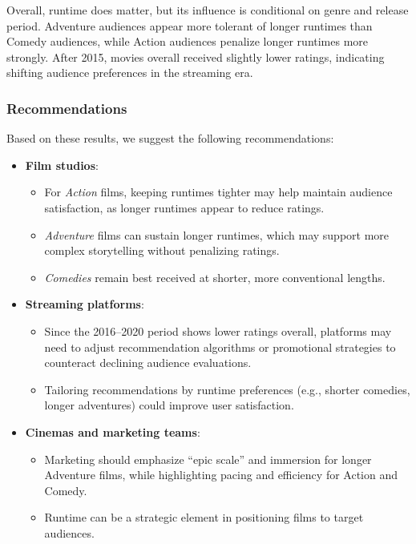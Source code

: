 \documentclass[
]{article}
\providecommand{\tightlist}{%
  \setlength{\itemsep}{0pt}\setlength{\parskip}{0pt}}
\begin{document}
Overall, runtime does matter, but its influence is conditional on genre
and release period. Adventure audiences appear more tolerant of longer
runtimes than Comedy audiences, while Action audiences penalize longer
runtimes more strongly. After 2015, movies overall received slightly
lower ratings, indicating shifting audience preferences in the streaming
era.

\subsubsection{Recommendations}\label{recommendations}

Based on these results, we suggest the following recommendations:

\begin{itemize}
\tightlist
\item
  \textbf{Film studios}:

  \begin{itemize}
  \tightlist
  \item
    For \emph{Action} films, keeping runtimes tighter may help maintain
    audience satisfaction, as longer runtimes appear to reduce
    ratings.\\
  \item
    \emph{Adventure} films can sustain longer runtimes, which may
    support more complex storytelling without penalizing ratings.\\
  \item
    \emph{Comedies} remain best received at shorter, more conventional
    lengths.
  \end{itemize}
\item
  \textbf{Streaming platforms}:

  \begin{itemize}
  \tightlist
  \item
    Since the 2016--2020 period shows lower ratings overall, platforms
    may need to adjust recommendation algorithms or promotional
    strategies to counteract declining audience evaluations.\\
  \item
    Tailoring recommendations by runtime preferences (e.g., shorter
    comedies, longer adventures) could improve user satisfaction.
  \end{itemize}
\item
  \textbf{Cinemas and marketing teams}:

  \begin{itemize}
  \tightlist
  \item
    Marketing should emphasize ``epic scale'' and immersion for longer
    Adventure films, while highlighting pacing and efficiency for Action
    and Comedy.\\
  \item
    Runtime can be a strategic element in positioning films to target
    audiences.
  \end{itemize}
\end{itemize}
\end{document}
